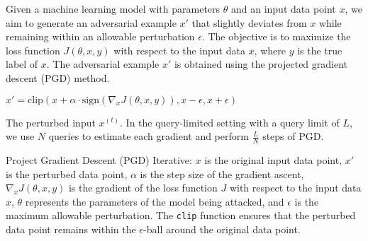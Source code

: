 Given a machine learning model with parameters $\theta$ and an input data point $x$, we aim to generate an adversarial example $x'$ that slightly deviates from $x$ while remaining within an allowable perturbation $\epsilon$. The objective is to maximize the loss function $J(\theta, x, y)$ with respect to the input data $x$, where $y$ is the true label of $x$. The adversarial example $x'$ is obtained using the projected gradient descent (PGD) method.

$x' = \text{clip}(x + \alpha \cdot \text{sign}(\nabla_x J(\theta, x, y)), x - \epsilon, x + \epsilon)$

The perturbed input $x^{(t)}$.
In the query-limited setting with a query limit of $L$, we use $N$ queries to estimate each gradient and perform $\frac{L}{N}$ steps of PGD.

Project Gradient Descent (PGD) Iterative:
$x$ is the original input data point,
$x'$ is the perturbed data point,
$\alpha$ is the step size of the gradient ascent,
$\nabla_x J(\theta, x, y)$ is the gradient of the loss function $J$ with respect to the input data $x$,
$\theta$ represents the parameters of the model being attacked, and
$\epsilon$ is the maximum allowable perturbation.
The \texttt{clip} function ensures that the perturbed data point remains within the $\epsilon$-ball around the original data point.